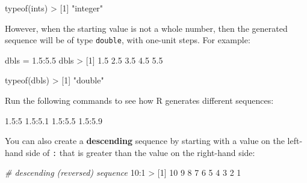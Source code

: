 \documentclass[
]{book}
\newenvironment{Shaded}{\begin{snugshade}}{\end{snugshade}}
\newcommand{\CommentTok}[1]{\textcolor[rgb]{0.56,0.35,0.01}{\textit{#1}}}
\newcommand{\DecValTok}[1]{\textcolor[rgb]{0.00,0.00,0.81}{#1}}
\newcommand{\FloatTok}[1]{\textcolor[rgb]{0.00,0.00,0.81}{#1}}
\newcommand{\FunctionTok}[1]{\textcolor[rgb]{0.00,0.00,0.00}{#1}}
\newcommand{\NormalTok}[1]{#1}
\newcommand{\OtherTok}[1]{\textcolor[rgb]{0.56,0.35,0.01}{#1}}
\newcommand{\SpecialCharTok}[1]{\textcolor[rgb]{0.00,0.00,0.00}{#1}}
\newcommand{\StringTok}[1]{\textcolor[rgb]{0.31,0.60,0.02}{#1}}
\begin{document}
\begin{Shaded}
\begin{Highlighting}[]
\FunctionTok{typeof}\NormalTok{(ints)}
\SpecialCharTok{\textgreater{}}\NormalTok{ [}\DecValTok{1}\NormalTok{] }\StringTok{"integer"}
\end{Highlighting}
\end{Shaded}

However, when the starting value is not a whole number, then the generated
sequence will be of type \texttt{double}, with one-unit steps. For example:

\begin{Shaded}
\begin{Highlighting}[]
\NormalTok{dbls }\OtherTok{=} \FloatTok{1.5}\SpecialCharTok{:}\FloatTok{5.5}
\NormalTok{dbls}
\SpecialCharTok{\textgreater{}}\NormalTok{ [}\DecValTok{1}\NormalTok{] }\FloatTok{1.5} \FloatTok{2.5} \FloatTok{3.5} \FloatTok{4.5} \FloatTok{5.5}

\FunctionTok{typeof}\NormalTok{(dbls)}
\SpecialCharTok{\textgreater{}}\NormalTok{ [}\DecValTok{1}\NormalTok{] }\StringTok{"double"}
\end{Highlighting}
\end{Shaded}

Run the following commands to see how R generates different sequences:

\begin{Shaded}
\begin{Highlighting}[]
\FloatTok{1.5}\SpecialCharTok{:}\DecValTok{5}
\FloatTok{1.5}\SpecialCharTok{:}\FloatTok{5.1}
\FloatTok{1.5}\SpecialCharTok{:}\FloatTok{5.5}
\FloatTok{1.5}\SpecialCharTok{:}\FloatTok{5.9}
\end{Highlighting}
\end{Shaded}

You can also create a \textbf{descending} sequence by starting with a value on the
left-hand side of \texttt{:} that is greater than the value on the right-hand side:

\begin{Shaded}
\begin{Highlighting}[]
\CommentTok{\# descending (reversed) sequence}
\DecValTok{10}\SpecialCharTok{:}\DecValTok{1}
\SpecialCharTok{\textgreater{}}\NormalTok{  [}\DecValTok{1}\NormalTok{] }\DecValTok{10}  \DecValTok{9}  \DecValTok{8}  \DecValTok{7}  \DecValTok{6}  \DecValTok{5}  \DecValTok{4}  \DecValTok{3}  \DecValTok{2}  \DecValTok{1}
\end{Highlighting}
\end{Shaded}
\end{document}

